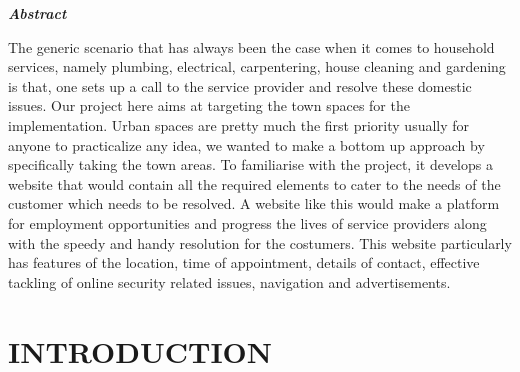 \documentclass[12pt,a4paper]{report}
\renewcommand{\baselinestretch}{1.35}
\begin{document}
\begin{titlepage}
\begin{table}[ht]
		\end{table}

\newpage
{}
\begin{center}

\textbf{\textit{\Large Abstract}}\\[1cm]
\end{center}
{\large The generic scenario that has always been the case when it comes to household services, namely plumbing, electrical, carpentering, house cleaning and gardening is that, one sets up a call to the service provider and resolve these domestic issues. Our project here aims at targeting the town spaces for the implementation. Urban spaces are pretty much the first priority usually for anyone to practicalize any idea, we wanted to make a bottom up approach by specifically taking the town areas. To familiarise with the project, it develops a website that would contain all the required elements to cater to the needs of the customer which needs to be resolved. A website like this would make a platform for employment opportunities and progress the lives of service providers along with the speedy and handy resolution for the costumers. This website particularly has features of the location, time of appointment, details of contact, effective tackling of online security related issues, navigation and advertisements.

\newpage
{}
\listoffigures

\newpage
\renewcommand{\baselinestretch}{0.5}
\tableofcontents
	\clearpage
	
\newpage
\renewcommand{\baselinestretch}{1.25}
\chapter{INTRODUCTION}
\Large

}
\end{titlepage}
\end{document}

